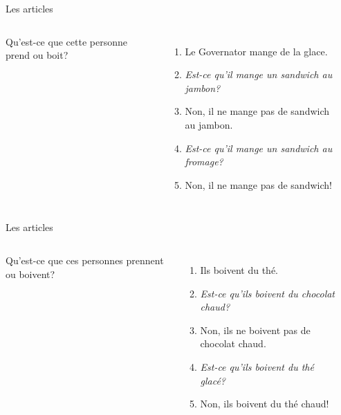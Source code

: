 \documentclass{beamer}
\begin{document}
  \begin{frame}{Les articles}
    \begin{columns}
        Qu'est-ce que cette personne prend ou boit?
        \begin{enumerate}
          \item<2-> Le Governator mange de la glace.
          \item<2-> \emph{Est-ce qu'il mange un sandwich au jambon?}
          \item<3-> Non, il ne mange pas de sandwich au jambon.
          \item<3-> \emph{Est-ce qu'il mange un sandwich au fromage?}
          \item<4-> Non, il ne mange pas de sandwich!
        \end{enumerate}
        \begin{minipage}[c][0.6\textwidth]{\linewidth}
          \begin{center}
          \end{center}
        \end{minipage}
    \end{columns}
  \end{frame}

  \begin{frame}{Les articles}
    \begin{columns}
        Qu'est-ce que ces personnes prennent ou boivent?
        \begin{enumerate}
          \item<2-> Ils boivent du thé.
          \item<2-> \emph{Est-ce qu'ils boivent du chocolat chaud?}
          \item<3-> Non, ils ne boivent pas de chocolat chaud.
          \item<3-> \emph{Est-ce qu'ils boivent du thé glacé?}
          \item<4-> Non, ils boivent du thé chaud!
        \end{enumerate}
        \begin{minipage}[c][0.6\textwidth]{\linewidth}
          \begin{center}
          \end{center}
        \end{minipage}
    \end{columns}
  \end{frame}
\end{document}
